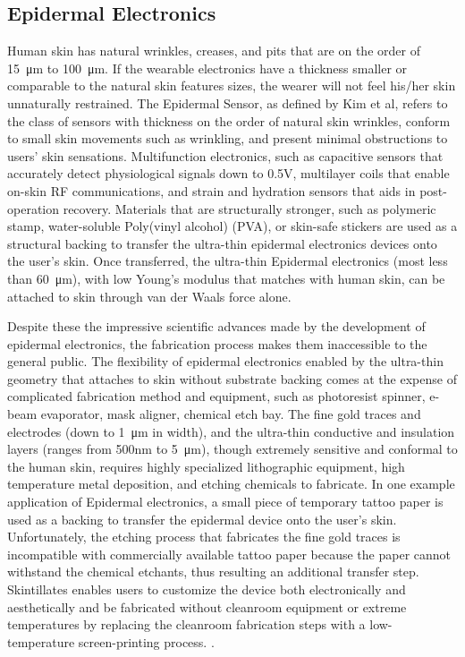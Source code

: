 \documentclass{sigchi}
\begin{document}
\subsection{Epidermal Electronics}
Human skin has natural wrinkles, creases, and pits that are on the order of \SI{15}{\micro\metre} to \SI{100}{\micro\metre}\cite{Tchvialeva:2014wla}. If the wearable electronics have a thickness smaller or comparable to the natural skin features sizes, the wearer will not feel his/her skin unnaturally restrained\cite{Kim:2011bv}. The Epidermal Sensor, as defined by Kim et al, refers to the class of sensors with thickness on the order of natural skin wrinkles, conform to small skin movements such as wrinkling, and present minimal obstructions to users’ skin sensations\cite{Kim:2011bv}. Multifunction electronics, such as capacitive sensors that accurately detect physiological signals down to 0.5V, multilayer coils that enable on-skin RF communications, and strain and hydration sensors that aids in post-operation recovery\cite{Jeong:2013km,Kim:2014iq,Bandodkar:2014dl,Kim:2011bv}. %
Materials that are structurally stronger, such as polymeric stamp, water-soluble Poly(vinyl alcohol) (PVA), or skin-safe stickers are used as a structural backing to transfer the ultra-thin epidermal electronics devices onto the user's skin\cite{Son:2014iya}. Once transferred, the ultra-thin Epidermal electronics (most less than \SI{60}{\micro\metre}), with low Young's modulus that matches with human skin, can be attached to skin through van der Waals force alone\cite{Son:2014iya,Kim:2011bv}. 

Despite these the impressive scientific advances made by the development of epidermal electronics, the fabrication process makes them inaccessible to the general public. The flexibility of epidermal electronics enabled by the ultra-thin geometry that attaches to skin without substrate backing comes at the expense of complicated fabrication method and equipment, such as photoresist spinner, e-beam evaporator, mask aligner, chemical etch bay. The fine gold traces and electrodes (down to \SI{1}{\micro\metre} in width), and the ultra-thin conductive and insulation layers (ranges from 500nm to 5\SI{}{\micro\metre}), though extremely sensitive and conformal to the human skin, requires highly specialized lithographic equipment, high temperature metal deposition, and etching chemicals to fabricate\cite{Kim:2011bv,Kim:2014iq}. In one example application of Epidermal electronics, a small piece of temporary tattoo paper is used as a backing to transfer the epidermal device onto the user's skin\cite{Kim:2011bv}. Unfortunately, the etching process that fabricates the fine gold traces is incompatible with commercially available tattoo paper because the paper cannot withstand the chemical etchants, thus resulting an additional transfer step. Skintillates enables users to customize the device both electronically and aesthetically and be fabricated without cleanroom equipment or extreme temperatures by replacing the cleanroom fabrication steps with a low-temperature screen-printing process. . 
\end{document}
